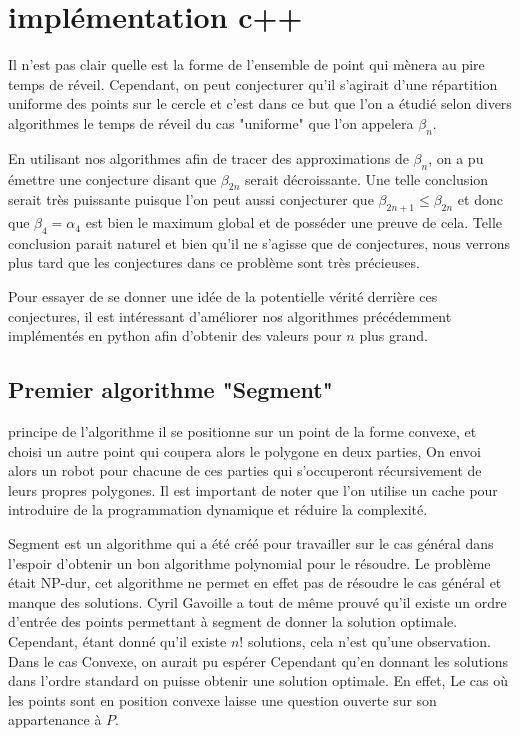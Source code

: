 \section{implémentation c++}

Il n'est pas clair quelle est la forme de l'ensemble de point qui mènera au pire temps de réveil. Cependant, on peut conjecturer qu'il s'agirait d'une répartition uniforme des points sur le cercle et c'est dans ce but que l'on a étudié selon divers algorithmes le temps de réveil du cas "uniforme" que l'on appelera $\beta_n$.

En utilisant nos algorithmes afin de tracer des approximations de $\beta_n$, on a pu émettre une conjecture disant que $\beta_{2n}$ serait décroissante. Une telle conclusion serait très puissante puisque l'on peut aussi conjecturer que $\beta_{2n + 1} \leq \beta_{2n}$ et donc que $\beta_4 = \alpha_4$ est bien le maximum global et de posséder une preuve de cela.
Telle conclusion parait naturel et bien qu'il ne s'agisse que de conjectures, nous verrons plus tard que les conjectures dans ce problème sont très précieuses.

Pour essayer de se donner une idée de la potentielle vérité derrière ces conjectures, il est intéressant d'améliorer nos algorithmes précédemment implémentés en python afin d'obtenir des valeurs pour $n$ plus grand.

\subsection{Premier algorithme "Segment"}

\large{principe de l'algorithme} il se positionne sur un point de la forme convexe, et choisi un autre point qui coupera alors le polygone en deux parties, On envoi alors un robot pour chacune de ces parties qui s'occuperont récursivement de leurs propres polygones.
Il est important de noter que l'on utilise un cache pour introduire de la programmation dynamique et réduire la complexité.

Segment est un algorithme qui a été créé pour travailler sur le cas général dans l'espoir d'obtenir un bon algorithme polynomial pour le résoudre. Le problème était NP-dur, cet algorithme ne permet en effet pas de résoudre le cas général et manque des solutions. Cyril Gavoille a tout de même prouvé qu'il existe un ordre d'entrée des points permettant à segment de donner la solution optimale. Cependant, étant donné qu'il existe $n!$ solutions, cela n'est qu'une observation.
Dans le cas Convexe, on aurait pu espérer Cependant qu'en donnant les solutions dans l'ordre standard on puisse obtenir une solution optimale. En effet, Le cas où les points sont en position convexe laisse une question ouverte sur son appartenance à $P$. 

